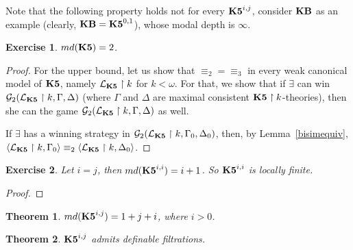 \documentclass[a4paper]{article}
\theoremstyle{defin}
\theoremstyle{theorem}
\newtheorem{theorem}{Theorem}
\theoremstyle{prop}
\theoremstyle{lemma}
\theoremstyle{fact}
\theoremstyle{exercise}
\newtheorem{exercise}{Exercise}
\theoremstyle{ex}
\theoremstyle{col}
\theoremstyle{claim}
\begin{document}
Note that the following property holds not for every ${\bf K5}^{i,j}$, consider ${\bf KB}$ as an example (clearly, ${\bf KB} = {\bf K5}^{0,1}$), whose modal depth is $\infty$.

\begin{exercise}
$md({\bf K5}) = 2$.
\end{exercise}

\begin{proof}
  For the upper bound, let us show that $\equiv_2 = \equiv_3$ in every weak canonical model of ${\bf K5}$, namely $\mathcal{L}_{\bf K5} \upharpoonright k$ for $k < \omega$.
  For that, we show that if $\exists$ can win $\mathcal{G}_2(\mathcal{L}_{\bf K5} \upharpoonright k, \Gamma, \Delta)$ (where $\Gamma$ and $\Delta$ are maximal consistent ${\bf K5} \upharpoonright k$-theories), then she can the game $\mathcal{G}_2(\mathcal{L}_{\bf K5} \upharpoonright k, \Gamma, \Delta)$ as well.

  If $\exists$ has a winning strategy in $\mathcal{G}_2(\mathcal{L}_{\bf K5} \upharpoonright k, \Gamma_0, \Delta_0)$, then, by Lemma~\ref{bisimequiv}, $\langle \mathcal{L}_{\bf K5} \upharpoonright k, \Gamma_0 \rangle \equiv_2 \langle \mathcal{L}_{\bf K5} \upharpoonright k, \Delta_0 \rangle$.
\end{proof}

\begin{exercise}
  Let $i = j$, then $md({\bf K5}^{i,i}) = i + 1$. So ${\bf K5}^{i,i}$ is locally finite.
\end{exercise}

\begin{proof}

\end{proof}

\begin{theorem}
$md({\bf K5}^{i,j}) = 1 + j + i$, where $i > 0$.
\end{theorem}

\begin{theorem}
  ${\bf K5}^{i,j}$ admits definable filtrations.
\end{theorem}
\end{document}
